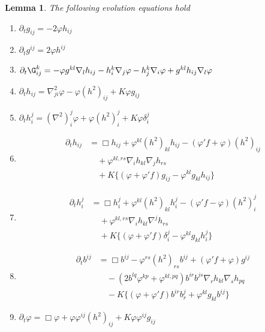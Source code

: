 \documentclass{amsart}
\newtheorem{lemma}[theorem]{Lemma}
\theoremstyle{definition}
\theoremstyle{remark}
\numberwithin{equation}{section}
\begin{document}
\begin{lemma}
\label{lem:evolution}
The following evolution equations hold
\begin{enumerate}
  \item \label{eq:delt_metric} $\partial_tg_{ij} = -2\varphi h_{ij}$
  \item \label{eq:delt_inversemetric} $\partial_t g^{ij} = 2\varphi h^{ij}$
  \item \label{eq:delt_christoffel} $\partial_t {\G}^{k}_{ij} = -\varphi g^{kl} \nabla_l h_{ij} - h^k_i \nabla_j \varphi - h^k_j \nabla_i \varphi + g^{kl} h_{ij} \nabla_l \varphi$
  \item \label{eq:delt_sff} $\partial_t h_{ij} = \nabla^2_{ji} \varphi - \varphi(h^2)_{ij} + K \varphi g_{ij}$
  \item \label{eq:delt_weingarten} $\partial_t h_i^j = (\nabla^2)^j_i\varphi + \varphi(h^2)_i^j + K \varphi\delta_i^j$
  \item \label{eq:delt_sff_box} \begin{align*}
\partial_t h_{ij} &= \Box h_{ij} + \varphi^{kl} (h^2)_{kl} h_{ij} - (\varphi'f + \varphi) (h^2)_{ij} \\
& \quad + \varphi^{kl,rs}\nabla_i h_{kl}\nabla_j h_{rs} \\
& \quad + K \{(\varphi + \varphi'f) g_{ij} - \varphi^{kl}g_{kl}h_{ij}\}
\end{align*}
  \item \label{eq:delt_weingarten_box} \begin{align*}
\partial_t h_i^j &= \Box h_i^j + \varphi^{kl} (h^2)_{kl} h_i^j - (\varphi'f - \varphi) (h^2)_i^j \\
& \quad + \varphi^{kl,rs}\nabla_i h_{kl}\nabla^j h_{rs} \\
& \quad + K \{(\varphi + \varphi'f) \delta_i^j - \varphi^{kl}g_{kl}h_i^j\}
\end{align*}
  \item \label{eq:delt_inversesff} \begin{align*}
\partial_t b^{ij} &= \Box b^{ij} - \varphi^{rs} (h^2)_{rs} b^{ij} + (\varphi'f + \varphi) g^{ij} \\  
& \quad - \left(2b^{lq}\varphi^{kp} + \varphi^{kl,pq}\right) b^{ir}b^{js} \nabla_r h_{kl} \nabla_s h_{pq} \\
& \quad - K \{(\varphi + \varphi'f) b^{ir}b^{j}_{r} + \varphi^{kl}g_{kl}b^{ij}\}
\end{align*}
  \item \label{eq:delt_speed} $\partial_t \varphi = \Box \varphi + \varphi\varphi^{ij}(h^2)_{ij} + K \varphi\varphi^{ij}g_{ij}$
\end{enumerate}
\end{lemma}
\end{document}
